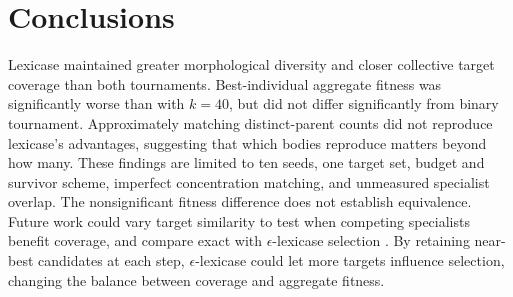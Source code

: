 \documentclass[sigconf]{acmart}
\begin{document}
\section{Conclusions}
Lexicase maintained greater morphological diversity and closer
collective target coverage than both tournaments. Best-individual
aggregate fitness was significantly worse than with $k=40$,
but did not differ significantly from binary tournament.
Approximately matching distinct-parent counts did not reproduce
lexicase's advantages, suggesting that which bodies reproduce
matters beyond how many. These findings are limited to ten seeds,
one target set, budget and survivor scheme, imperfect concentration
matching, and unmeasured specialist overlap. The nonsignificant
fitness difference does not establish equivalence.
Future work could vary target similarity to test when competing
specialists benefit coverage, and compare exact with
$\epsilon$-lexicase selection \cite{lacava2016epsilon}.
By retaining near-best candidates at each step,
$\epsilon$-lexicase could let more targets influence selection, changing
the balance between coverage and aggregate fitness.


\clearpage
\balance


\end{document}
